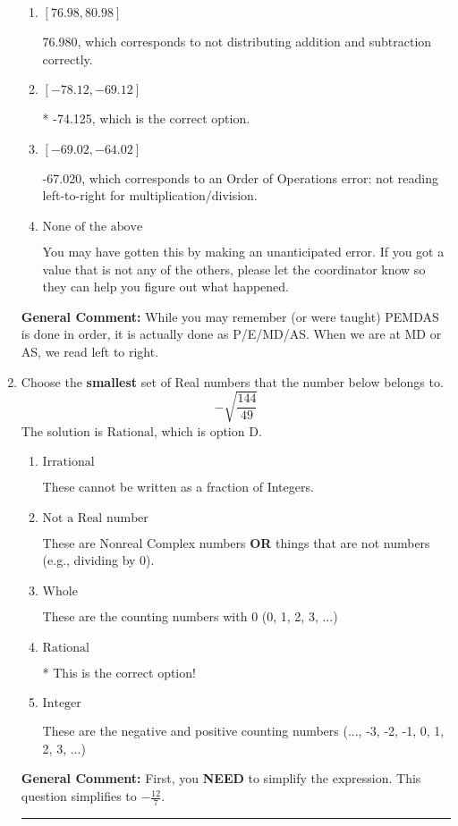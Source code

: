 \documentclass{extbook}[14pt]
\newcommand{\litem}[1]{\item #1

\rule{\textwidth}{0.4pt}}
\begin{document}
\begin{enumerate}
{\begin{enumerate}[label=\Alph*.]
 -110.250, which corresponds to not distributing a negative correctly.
\item \( [76.98, 80.98] \)

 76.980, which corresponds to not distributing addition and subtraction correctly.
\item \( [-78.12, -69.12] \)

* -74.125, which is the correct option.
\item \( [-69.02, -64.02] \)

 -67.020, which corresponds to an Order of Operations error: not reading left-to-right for multiplication/division.
\item \( \text{None of the above} \)

 You may have gotten this by making an unanticipated error. If you got a value that is not any of the others, please let the coordinator know so they can help you figure out what happened.
\end{enumerate}

\textbf{General Comment:} While you may remember (or were taught) PEMDAS is done in order, it is actually done as P/E/MD/AS. When we are at MD or AS, we read left to right.
}
\litem{
Choose the \textbf{smallest} set of Real numbers that the number below belongs to.
\[ -\sqrt{\frac{144}{49}} \]The solution is \( \text{Rational} \), which is option D.\begin{enumerate}[label=\Alph*.]
\item \( \text{Irrational} \)

These cannot be written as a fraction of Integers.
\item \( \text{Not a Real number} \)

These are Nonreal Complex numbers \textbf{OR} things that are not numbers (e.g., dividing by 0).
\item \( \text{Whole} \)

These are the counting numbers with 0 (0, 1, 2, 3, ...)
\item \( \text{Rational} \)

* This is the correct option!
\item \( \text{Integer} \)

These are the negative and positive counting numbers (..., -3, -2, -1, 0, 1, 2, 3, ...)
\end{enumerate}

\textbf{General Comment:} First, you \textbf{NEED} to simplify the expression. This question simplifies to $-\frac{12}{7}$. 
 
}
\end{enumerate}
\end{document}
